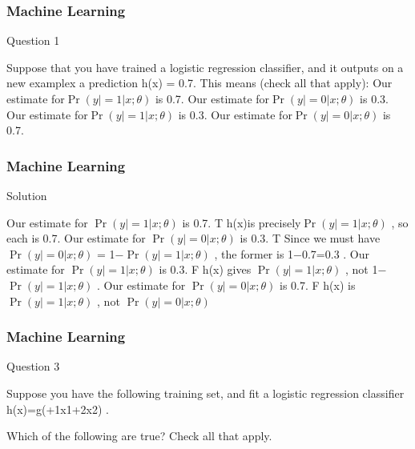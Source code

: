 
\begin{frame}
	\frametitle{Machine Learning} 
	\large 

Question 1

Suppose that you have trained a logistic regression classifier, and it outputs on a new examplex a prediction h\theta(x) = 0.7.
This means (check all that apply): 
 Our estimate for$ \Pr(y|=1|x;\theta)$ is 0.7.
 Our estimate for$ \Pr(y|=0|x;\theta)$ is 0.3.
 Our estimate for$ \Pr(y|=1|x;\theta)$ is 0.3.
 Our estimate for$ \Pr(y|=0|x;\theta)$ is 0.7.
\end{frame}
\begin{frame}
	\frametitle{Machine Learning} 
	\large 
Solution
 
Our estimate for $ \Pr(y|=1|x;\theta)$ is 0.7.  T h\theta(x)is precisely$ \Pr(y|=1|x;\theta)$ , so each is 0.7.
Our estimate for $ \Pr(y|=0|x;\theta)$ is 0.3.  T Since we must have $ \Pr(y|=0|x;\theta)$ = 1−$ \Pr(y|=1|x;\theta)$ , the former is 1−0.7=0.3 .
Our estimate for $ \Pr(y|=1|x;\theta)$ is 0.3.  F h\theta(x) gives $ \Pr(y|=1|x;\theta)$ , not 1−$ \Pr(y|=1|x;\theta)$ . 
Our estimate for $ \Pr(y|=0|x;\theta)$ is 0.7.  F h\theta(x) is $ \Pr(y|=1|x;\theta)$ , not $ \Pr(y|=0|x;\theta)$ 
\end{frame}
\begin{frame}
	\frametitle{Machine Learning} 
	\large 

Question 3
 
Suppose you have the following training set, and fit a logistic regression classifier h\theta(x)=g(+\theta1x1+\theta2x2) .
  
Which of the following are true? Check all that apply. 
 
\end{frame}
